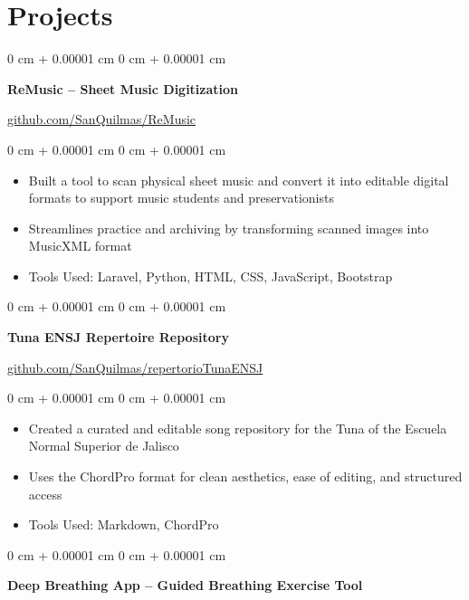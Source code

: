 \documentclass[10pt, letterpaper]{article}
\newenvironment{highlights}{
    \begin{itemize}[
        topsep=0.10 cm,
        parsep=0.10 cm,
        partopsep=0pt,
        itemsep=0pt,
        leftmargin=0 cm + 10pt
    ]
}{
    \end{itemize}
} %
\newenvironment{onecolentry}{
    \begin{adjustwidth}{
        0 cm + 0.00001 cm
    }{
        0 cm + 0.00001 cm
    }
}{
    \end{adjustwidth}
} %
\begin{document}
    \section{Projects}
        \begin{onecolentry}
            \textbf{ReMusic – Sheet Music Digitization} 
        \end{onecolentry}
        \vspace{0.05 cm}
            \href{https://github.com/SanQuilmas/ReMusic}{github.com/SanQuilmas/ReMusic}
        \vspace{0.10 cm}
        \begin{onecolentry}
            \begin{highlights}
                \item Built a tool to scan physical sheet music and convert it into editable digital formats to support music students and preservationists
                \item Streamlines practice and archiving by transforming scanned images into MusicXML format
                \item Tools Used: Laravel, Python, HTML, CSS, JavaScript, Bootstrap
            \end{highlights}
        \end{onecolentry}
    \vspace{0.2 cm}
        \begin{onecolentry}
            \textbf{Tuna ENSJ Repertoire Repository} 
        \end{onecolentry}
        \vspace{0.05 cm}
            \href{https://github.com/SanQuilmas/repertorioTunaENSJ}{github.com/SanQuilmas/repertorioTunaENSJ}
        \vspace{0.10 cm}
        \begin{onecolentry}
            \begin{highlights}
                \item Created a curated and editable song repository for the Tuna of the Escuela Normal Superior de Jalisco
                \item Uses the ChordPro format for clean aesthetics, ease of editing, and structured access
                \item Tools Used: Markdown, ChordPro
            \end{highlights}
        \end{onecolentry}
        \vspace{0.2 cm}
            \begin{onecolentry}
                \textbf{Deep Breathing App – Guided Breathing Exercise Tool}
            \end{onecolentry}
\end{document}
